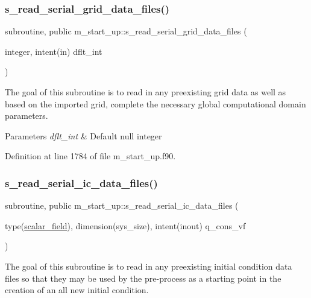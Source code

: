 \subsubsection{\texorpdfstring{s\+\_\+read\+\_\+serial\+\_\+grid\+\_\+data\+\_\+files()}{s\_read\_serial\_grid\_data\_files()}}
{\footnotesize\ttfamily subroutine, public m\+\_\+start\+\_\+up\+::s\+\_\+read\+\_\+serial\+\_\+grid\+\_\+data\+\_\+files (\begin{DoxyParamCaption}\item[{integer, intent(in)}]{dflt\+\_\+int }\end{DoxyParamCaption})}



The goal of this subroutine is to read in any preexisting grid data as well as based on the imported grid, complete the necessary global computational domain parameters. 


\begin{DoxyParams}{Parameters}
{\em dflt\+\_\+int} & Default null integer \\
\hline
\end{DoxyParams}


Definition at line 1784 of file m\+\_\+start\+\_\+up.\+f90.

\mbox{\label{namespacem__start__up_a88f1f355d8aeecb6cd47653ed285cfa2}} 
\subsubsection{\texorpdfstring{s\+\_\+read\+\_\+serial\+\_\+ic\+\_\+data\+\_\+files()}{s\_read\_serial\_ic\_data\_files()}}
{\footnotesize\ttfamily subroutine, public m\+\_\+start\+\_\+up\+::s\+\_\+read\+\_\+serial\+\_\+ic\+\_\+data\+\_\+files (\begin{DoxyParamCaption}\item[{type(\hyperlink{structm__derived__types_1_1scalar__field}{scalar\+\_\+field}), dimension(sys\+\_\+size), intent(inout)}]{q\+\_\+cons\+\_\+vf }\end{DoxyParamCaption})}



The goal of this subroutine is to read in any preexisting initial condition data files so that they may be used by the pre-\/process as a starting point in the creation of an all new initial condition. 


